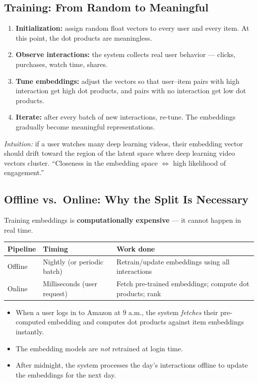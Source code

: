 \documentclass[11pt]{article}
\begin{document}
\subsection{Training: From Random to Meaningful}
\begin{enumerate}
    \item \textbf{Initialization:} assign random float vectors to every
      user and every item. At this point, the dot products are meaningless.
    \item \textbf{Observe interactions:} the system collects real user
      behavior --- clicks, purchases, watch time, shares.
    \item \textbf{Tune embeddings:} adjust the vectors so that user--item
      pairs with high interaction get high dot products, and pairs with
      no interaction get low dot products.
    \item \textbf{Iterate:} after every batch of new interactions,
      re-tune. The embeddings gradually become meaningful representations.
\end{enumerate}

\textit{Intuition:} if a user watches many deep learning videos, their
embedding vector should drift toward the region of the latent space where
deep learning video vectors cluster. ``Closeness in the embedding space
$\Leftrightarrow$ high likelihood of engagement.''

\subsection{Offline vs.\ Online: Why the Split Is Necessary}
Training embeddings is \textbf{computationally expensive} --- it cannot
happen in real time.

\begin{center}
\begin{tabular}{@{}lll@{}}
\toprule
\textbf{Pipeline} & \textbf{Timing} & \textbf{Work done} \\
\midrule
Offline & Nightly (or periodic batch) & Retrain/update embeddings using all interactions \\
Online  & Milliseconds (user request) & Fetch pre-trained embeddings; compute dot products; rank \\
\bottomrule
\end{tabular}
\end{center}

\begin{itemize}
    \item When a user logs in to Amazon at 9 a.m., the system \emph{fetches}
      their pre-computed embedding and computes dot products against item
      embeddings instantly.
    \item The embedding models are \emph{not} retrained at login time.
    \item After midnight, the system processes the day's interactions
      offline to update the embeddings for the next day.
\end{itemize}
\end{document}
